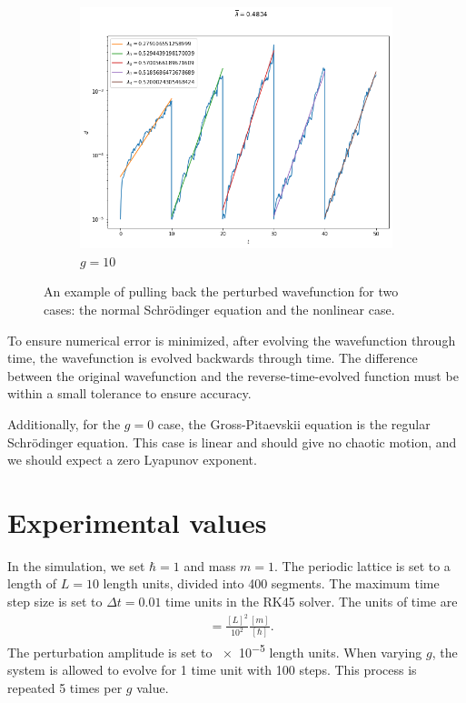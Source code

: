 \begin{figure}[p]
		 \begin{subfigure}[b]{0.75\textwidth}
			\includegraphics[width=\linewidth]{chapter3/pullbacks}
			\caption{$g=10$}
		\end{subfigure}
		\caption[An example of pulling back the perturbed wavefunction.]{An example of pulling back the perturbed wavefunction for two cases: the normal Schr\"odinger equation and the nonlinear case. }
		\label{fig:pullbacks}
	\end{figure}
	

	To ensure numerical error is minimized, after evolving the wavefunction through time, the wavefunction is evolved backwards through time. The difference between the original wavefunction and the reverse-time-evolved function must be within a small tolerance to ensure accuracy.
	
	Additionally, for the $g=0$ case, the Gross-Pitaevskii equation is the regular Schr\"odinger equation. This case is linear and should give no chaotic motion, and we should expect a zero Lyapunov exponent.
	
	\section{Experimental values}
	In the simulation, we set $\hbar=1$ and mass $m=1$. The periodic lattice is set to a length of $L=10$ length units, divided into 400 segments. The maximum time step size is set to $\Delta t = 0.01$ time units in the RK45 solver.	The units of time are \begin{align*}
		[t] & = \frac{[L]^2}{10^2} \frac{[m]}{[\hbar]}.
		\end{align*}
	The perturbation amplitude is set to \num{e-5} length units. When varying $g$, the system is allowed to evolve for 1 time unit with 100 steps. This process is repeated 5 times per $g$ value.
%	
%	
	